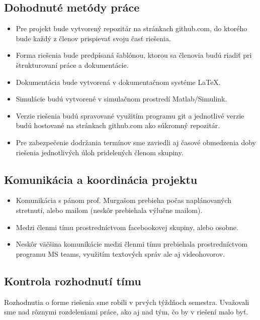 \documentclass[../main.tex]{subfiles}
\begin{document}
    \subsection{Dohodnuté metódy práce}   
    	\begin{itemize}
    		\item Pre projekt bude vytvorený repozitár na stránkach github.com, do ktorého bude každý z členov prispievať svoju časť riešenia.
    		\item Forma riešenia bude predpísaná šablónou, ktorou sa členovia budú riadiť pri štrukturovaní práce a dokumentácie.
            \item Dokumentácia bude vytvorená v dokumentačnom systéme LaTeX.
            \item Simulácie budú vytvorené v simulačnom prostredí Matlab/Simulink.
            \item Verzie riešenia budú spravované využitím programu git a jednotlivé verzie budú hostované na stránkach github.com ako súkromný repozitár.
            \item Pre zabezpečenie dodržania termínov sme zaviedli aj časové obmedzenia doby riešenia jednotlivých úloh pridelených členom skupiny.
    	\end{itemize}

    \subsection{Komunikácia a koordinácia projektu}
    	\begin{itemize}
            \item Komunikácia s pánom prof. Murgašom prebieha počas naplánovaných stretnutí, alebo mailom (neskôr prebiehala výlučne mailom).
    		\item Medzi členmi tímu prostredníctvom facebookovej skupiny, alebo osobne. 
            \item Neskôr väčšina komunikácie medzi členmi tímu prebiehala prostredníctvom programu MS teams, využitím textových správ ale aj videohovorov.
    	\end{itemize}

    \subsection{Kontrola rozhodnutí tímu}
    Rozhodnutia o forme riešenia sme robili v prvých týždňoch semestra. Uvažovali sme nad rôznymi rozdeleniami práce, ako aj nad tým, čo by v riešení malo byť. 
\end{document}
